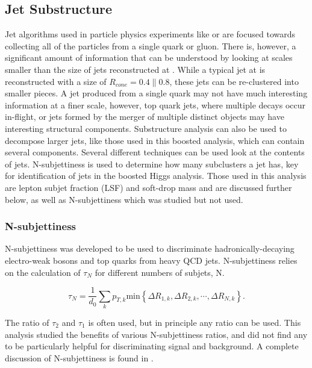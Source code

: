 \subsection{Jet Substructure}

Jet algorithms used in particle physics experiments like \CMS or \ATLAS are focused towards collecting all of the particles from a single quark or gluon.  There is, however, a significant amount of information that can be understood by looking at scales smaller than the size of jets reconstructed at \CMS. While a typical jet at \CMS is reconstructed with a size of \ensuremath{R_{cone} = 0.4 \| 0.8}, these jets can be re-clustered into smaller pieces.  A jet produced from a single quark may not have much interesting information at a finer scale, however, top quark jets, where multiple decays occur in-flight, or jets formed by the merger of multiple distinct objects may have interesting structural components.  Substructure analysis can also be used to decompose larger jets, like those used in this boosted analysis, which can contain several components. Several different techniques can be used look at the contents of jets.  N-subjettiness is used to determine how many subclusters a jet has, key for identification of jets in the boosted Higgs analysis. Those used in this analysis are lepton subjet fraction (LSF) and soft-drop mass and are discussed further below, as well as N-subjettiness which was studied but not used.

\subsubsection{N-subjettiness}

N-subjettiness was developed to be used to discriminate hadronically-decaying electro-weak bosons and top quarks from heavy QCD jets. N-subjettiness relies on the calculation of $\tau_{N}$ for different numbers of subjets, N.

\begin{equation}
    \label{eq:nsubjettiness}
    \tau_{N}
    =
    \frac{1}{d_{0}}\sum_{k} {p_{T,k} \mathrm{min} \left\{\Delta R_{1,k}, \Delta R_{2,k},\cdots,\Delta R_{N,k} \right\} } .
\end{equation}

The ratio of $\tau_{2}$ and $\tau_{1}$ is often used, but in principle any ratio can be used. This analysis studied the benefits of various N-subjettiness ratios, and did not find any to be particularly helpful for discriminating signal and background. A complete discussion of N-subjettiness is found in \cite{Nsubjettiness}.

